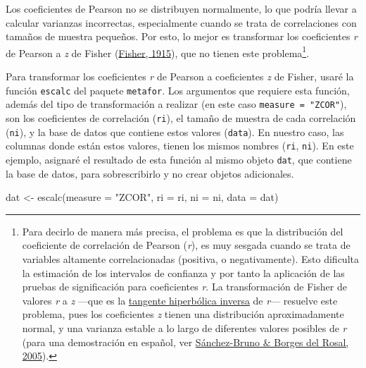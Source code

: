 \documentclass[
  bookmarksnumbered]{article}
\newenvironment{Shaded}{\begin{snugshade}}{\end{snugshade}}
\newcommand{\AttributeTok}[1]{\textcolor[rgb]{0.00,0.34,0.68}{#1}}
\newcommand{\FunctionTok}[1]{\textcolor[rgb]{0.39,0.29,0.61}{#1}}
\newcommand{\NormalTok}[1]{\textcolor[rgb]{0.12,0.11,0.11}{#1}}
\newcommand{\OtherTok}[1]{\textcolor[rgb]{0.00,0.43,0.16}{#1}}
\newcommand{\StringTok}[1]{\textcolor[rgb]{0.75,0.01,0.01}{#1}}
\begin{document}
Los coeficientes de Pearson no se distribuyen normalmente, lo que podría llevar a calcular varianzas incorrectas, especialmente cuando se trata de correlaciones con tamaños de muestra pequeños. Por esto, lo mejor es transformar los coeficientes \emph{r} de Pearson a \emph{z} de Fisher (\protect\hyperlink{ref-fisherFrequencyDistributionValues1915}{Fisher, 1915}), que no tienen este problema\footnote{Para decirlo de manera más precisa, el problema es que la distribución del coeficiente de correlación de Pearson (\emph{r}), es muy sesgada cuando se trata de variables altamente correlacionadas (positiva, o negativamente). Esto dificulta la estimación de los intervalos de confianza y por tanto la aplicación de las pruebas de significación para coeficientes \emph{r}. La transformación de Fisher de valores \emph{r} a \emph{z} ---que es la \href{https://es.wikipedia.org/wiki/Tangente_hiperb\%C3\%B3lica}{tangente hiperbólica inversa} de \emph{r}--- resuelve este problema, pues los coeficientes \emph{z} tienen una distribución aproximadamente normal, y una varianza estable a lo largo de diferentes valores posibles de \emph{r} (para una demostración en español, ver \protect\hyperlink{ref-sanchez-brunoTransformacionFisherPara2005}{Sánchez-Bruno \& Borges del Rosal, 2005}).}.

Para transformar los coeficientes \emph{r} de Pearson a coeficientes \emph{z} de Fisher, usaré la función \texttt{escalc} del paquete \texttt{metafor}. Los argumentos que requiere esta función, además del tipo de transformación a realizar (en este caso \texttt{measure\ =\ "ZCOR"}), son los coeficientes de correlación (\texttt{ri}), el tamaño de muestra de cada correlación (\texttt{ni}), y la base de datos que contiene estos valores (\texttt{data}). En nuestro caso, las columnas donde están estos valores, tienen los mismos nombres (\texttt{ri}, \texttt{ni}). En este ejemplo, asignaré el resultado de esta función al mismo objeto \texttt{dat}, que contiene la base de datos, para sobrescribirlo y no crear objetos adicionales.

\begin{Shaded}
\begin{Highlighting}[]
\NormalTok{dat }\OtherTok{\textless{}{-}} \FunctionTok{escalc}\NormalTok{(}\AttributeTok{measure =} \StringTok{"ZCOR"}\NormalTok{, }\AttributeTok{ri =}\NormalTok{ ri, }\AttributeTok{ni =}\NormalTok{ ni, }\AttributeTok{data =}\NormalTok{ dat)}
\end{Highlighting}
\end{Shaded}
\end{document}
